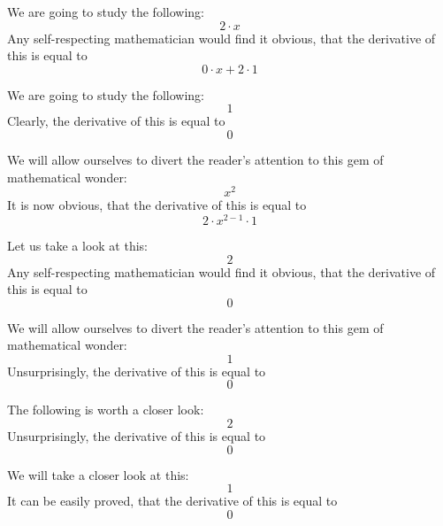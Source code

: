 \documentclass{article}
\begin{document}
We are going to study the following:
\begin{equation}
2 \cdot x 
\end{equation}
Any self-respecting mathematician would find it obvious, that the derivative of this is equal to
\begin{equation}
0 \cdot x + 2 \cdot 1 
\end{equation}

We are going to study the following:
\begin{equation}
1 
\end{equation}
Clearly, the derivative of this is equal to
\begin{equation}
0 
\end{equation}

We will allow ourselves to divert the reader's attention to this gem of mathematical wonder:
\begin{equation}
x ^{2 } 
\end{equation}
It is now obvious, that the derivative of this is equal to
\begin{equation}
2 \cdot x ^{2 - 1 } \cdot 1 
\end{equation}

Let us take a look at this:
\begin{equation}
2 
\end{equation}
Any self-respecting mathematician would find it obvious, that the derivative of this is equal to
\begin{equation}
0 
\end{equation}

We will allow ourselves to divert the reader's attention to this gem of mathematical wonder:
\begin{equation}
1 
\end{equation}
Unsurprisingly, the derivative of this is equal to
\begin{equation}
0 
\end{equation}

The following is worth a closer look:
\begin{equation}
2 
\end{equation}
Unsurprisingly, the derivative of this is equal to
\begin{equation}
0 
\end{equation}

We will take a closer look at this:
\begin{equation}
1 
\end{equation}
It can be easily proved, that the derivative of this is equal to
\begin{equation}
0 
\end{equation}
\end{document}
